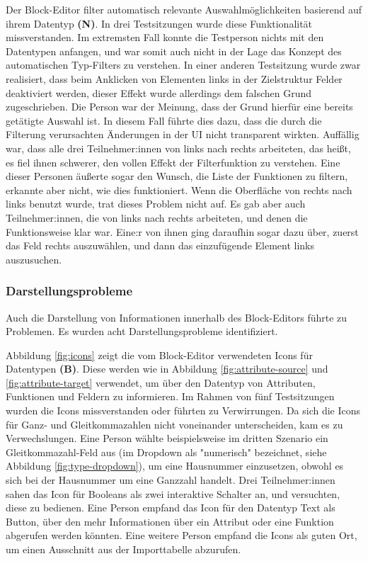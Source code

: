 Der Block-Editor filter automatisch relevante Auswahlmöglichkeiten basierend auf ihrem Datentyp \textbf{(N)}. In drei Testsitzungen wurde diese Funktionalität missverstanden. Im extremsten Fall konnte die Testperson nichts mit den Datentypen anfangen, und war somit auch nicht in der Lage das Konzept des automatischen Typ-Filters zu verstehen. In einer anderen Testsitzung wurde zwar realisiert, dass beim Anklicken von Elementen links in der Zielstruktur Felder deaktiviert werden, dieser Effekt wurde allerdings dem falschen Grund zugeschrieben. Die Person war der Meinung, dass der Grund hierfür eine bereits getätigte Auswahl ist. In diesem Fall führte dies dazu, dass die durch die Filterung verursachten Änderungen in der UI nicht transparent wirkten. Auffällig war, dass alle drei Teilnehmer:innen von links nach rechts arbeiteten, das heißt, es fiel ihnen schwerer, den vollen Effekt der Filterfunktion zu verstehen. Eine dieser Personen äußerte sogar den Wunsch, die Liste der Funktionen zu filtern, erkannte aber nicht, wie dies funktioniert. Wenn die Oberfläche von rechts nach links benutzt wurde, trat dieses Problem nicht auf. Es gab aber auch Teilnehmer:innen, die von links nach rechts arbeiteten, und denen die Funktionsweise klar war. Eine:r von ihnen ging daraufhin sogar dazu über, zuerst das Feld rechts auszuwählen, und dann das einzufügende Element links auszusuchen.

\subsubsection{Darstellungsprobleme}

Auch die Darstellung von Informationen innerhalb des Block-Editors führte zu Problemen. Es wurden acht Darstellungsprobleme identifiziert.

Abbildung \ref{fig:icons} zeigt die vom Block-Editor verwendeten Icons für Datentypen \textbf{(B)}. Diese werden wie in Abbildung \ref{fig:attribute-source} und \ref{fig:attribute-target} verwendet, um über den Datentyp von Attributen, Funktionen und Feldern zu informieren. Im Rahmen von fünf Testsitzungen wurden die Icons missverstanden oder führten zu Verwirrungen. Da sich die Icons für Ganz- und Gleitkommazahlen nicht voneinander unterscheiden, kam es zu Verwechslungen. Eine Person wählte beispielsweise im dritten Szenario ein Gleitkommazahl-Feld aus (im Dropdown als "numerisch" bezeichnet, siehe Abbildung \ref{fig:type-dropdown}), um eine Hausnummer einzusetzen, obwohl es sich bei der Hausnummer um eine Ganzzahl handelt.  Drei Teilnehmer:innen sahen das Icon für Booleans als zwei interaktive Schalter an, und versuchten, diese zu bedienen. Eine Person empfand das Icon für den Datentyp Text als Button, über den mehr Informationen über ein Attribut oder eine Funktion abgerufen werden könnten. Eine weitere Person empfand die Icons als guten Ort, um einen Ausschnitt aus der Importtabelle abzurufen.

